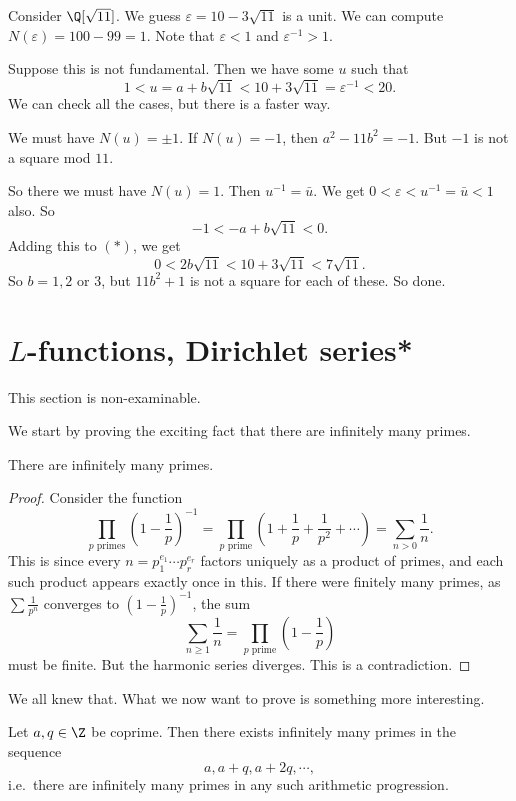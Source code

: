 \documentclass[a4paper]{article}
\begin{document}
\begin{eg}
  Consider $\Q[\sqrt{11}]$. We guess $\varepsilon = 10 - 3\sqrt{11}$ is a unit. We can compute $N(\varepsilon) = 100 - 99 = 1$. Note that $\varepsilon < 1$ and $\varepsilon^{-1} > 1$.

  Suppose this is not fundamental. Then we have some $u$ such that
  \[
    1 < u = a + b\sqrt{11} < 10 + 3\sqrt{11} = \varepsilon^{-1} < 20.\tag{$*$}
  \]
  We can check all the cases, but there is a faster way.

  We must have $N(u) = \pm 1$. If $N(u) = -1$, then $a^2 - 11b^2 = -1$. But $-1$ is not a square mod $11$.

  So there we must have $N(u) = 1$. Then $u^{-1} = \bar{u}$. We get $0 < \varepsilon < u^{-1} = \bar{u} < 1$ also. So
  \[
    -1 < -a + b\sqrt{11} < 0.
  \]
  Adding this to $(*)$, we get
  \[
    0 < 2b\sqrt{11} < 10 + 3\sqrt{11} < 7\sqrt{11}.
  \]
  So $b = 1, 2$ or $3$, but $11b^2 + 1$ is not a square for each of these. So done.
\end{eg}

\section{\texorpdfstring{$L$}{L}-functions, Dirichlet series*}
This section is non-examinable.

We start by proving the exciting fact that there are infinitely many primes.
\begin{thm}[Euclid]
  There are infinitely many primes.
\end{thm}

\begin{proof}
  Consider the function
  \[
    \prod_{p\text{ primes}} \left(1 - \frac{1}{p}\right)^{-1} = \prod_{p\text{ prime}}\left(1 + \frac{1}{p} + \frac{1}{p^2} + \cdots\right) = \sum_{n > 0}\frac{1}{n}.
  \]
  This is since every $n = p_1^{e_1} \cdots p_r^{e_r}$ factors uniquely as a product of primes, and each such product appears exactly once in this. If there were finitely many primes, as $\sum \frac{1}{p^n}$ converges to $\left(1 - \frac{1}{p}\right)^{-1}$, the sum
  \[
    \sum_{n \geq 1}\frac{1}{n} = \prod_{p\text{ prime}} \left(1 - \frac{1}{p}\right)
  \]
  must be finite. But the harmonic series diverges. This is a contradiction.
\end{proof}

We all knew that. What we now want to prove is something more interesting.
\begin{thm}
  Let $a, q \in \Z$ be coprime. Then there exists infinitely many primes in the sequence
  \[
    a, a + q, a + 2q, \cdots,
  \]
  i.e.\ there are infinitely many primes in any such arithmetic progression.
\end{thm}
\end{document}
